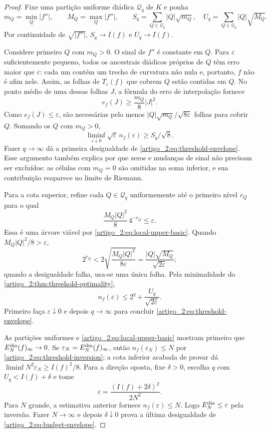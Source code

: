 \begin{proof}
Fixe uma partição uniforme diádica $\mathcal Q_q$ de $K$ e ponha
\[
 m_Q=\min_Q|f''|,
 \qquad M_Q=\max_Q|f''|,
 \qquad
 S_q=\sum_{Q\in\mathcal Q_q}|Q|\sqrt{m_Q},
 \quad U_q=\sum_{Q\in\mathcal Q_q}|Q|\sqrt{M_Q}.
\]
Por continuidade de $\sqrt{|f''|}$, $S_q\to I(f)$ e $U_q\to I(f)$.

Considere primeiro $Q$ com $m_Q>0$. O sinal de $f''$ é constante em $Q$.
Para $\varepsilon$ suficientemente pequeno, todos os ancestrais diádicos
próprios de $Q$ têm erro maior que $\varepsilon$: cada um contém um trecho
de curvatura não nula e, portanto, $f$ não é afim nele. Assim, as folhas de
$T_\varepsilon(f)$ que cobrem $Q$ estão contidas em $Q$. No ponto médio de
uma dessas folhas $J$, a fórmula do erro de interpolação fornece
\[
 e_f(J)\ge \frac{m_Q}{8}|J|^2.
\]
Como $e_f(J)\le\varepsilon$, são necessárias pelo menos
$|Q|\sqrt{m_Q}/\sqrt{8\varepsilon}$ folhas para cobrir $Q$. Somando os
$Q$ com $m_Q>0$,
\[
 \liminf_{\varepsilon\downarrow0}
 \sqrt\varepsilon\,n_f(\varepsilon)\ge S_q/\sqrt8.
\]
Fazer $q\to\infty$ dá a primeira desigualdade de
\eqref{artigo_2:eq:threshold-envelope}. Esse argumento também explica por que zeros e
mudanças de sinal não precisam ser excluídos: as células com $m_Q=0$ são
omitidas na soma inferior, e sua contribuição reaparece no limite de Riemann.

Para a cota superior, refine cada $Q\in\mathcal Q_q$ uniformemente até o
primeiro nível $r_Q$ para o qual
\[
 \frac{M_Q|Q|^2}{8}\,4^{-r_Q}\le\varepsilon.
\]
Essa é uma árvore viável por \eqref{artigo_2:eq:local-upper-basic}. Quando
$M_Q|Q|^2/8>\varepsilon$,
\[
 2^{r_Q}<2\sqrt{\frac{M_Q|Q|^2}{8\varepsilon}}
 =\frac{|Q|\sqrt{M_Q}}{\sqrt{2\varepsilon}};
\]
quando a desigualdade falha, usa-se uma única folha. Pela minimalidade do
\cref{artigo_2:thm:threshold-optimality},
\[
 n_f(\varepsilon)
 \le 2^q+\frac{U_q}{\sqrt{2\varepsilon}}.
\]
Primeiro faça $\varepsilon\downarrow0$ e depois $q\to\infty$ para concluir
\eqref{artigo_2:eq:threshold-envelope}.

As partições uniformes e \eqref{artigo_2:eq:local-upper-basic} mostram primeiro que
$E_N^{\rm dia}(f)_\infty\to0$. Se
$\varepsilon_N=E_N^{\rm dia}(f)_\infty$, então
$n_f(\varepsilon_N)\le N$ por \eqref{artigo_2:eq:threshold-inversion}; a cota inferior
acabada de provar dá
$\liminf N^2\varepsilon_N\ge I(f)^2/8$. Para a direção oposta, fixe
$\delta>0$, escolha $q$ com $U_q<I(f)+\delta$ e tome
\[
 \varepsilon=\frac{(I(f)+2\delta)^2}{2N^2}.
\]
Para $N$ grande, a estimativa anterior fornece
$n_f(\varepsilon)\le N$. Logo $E_N^{\rm dia}\le\varepsilon$ pela inversão.
Fazer $N\to\infty$ e depois $\delta\downarrow0$ prova a última desigualdade
de \eqref{artigo_2:eq:budget-envelope}.
\end{proof}

